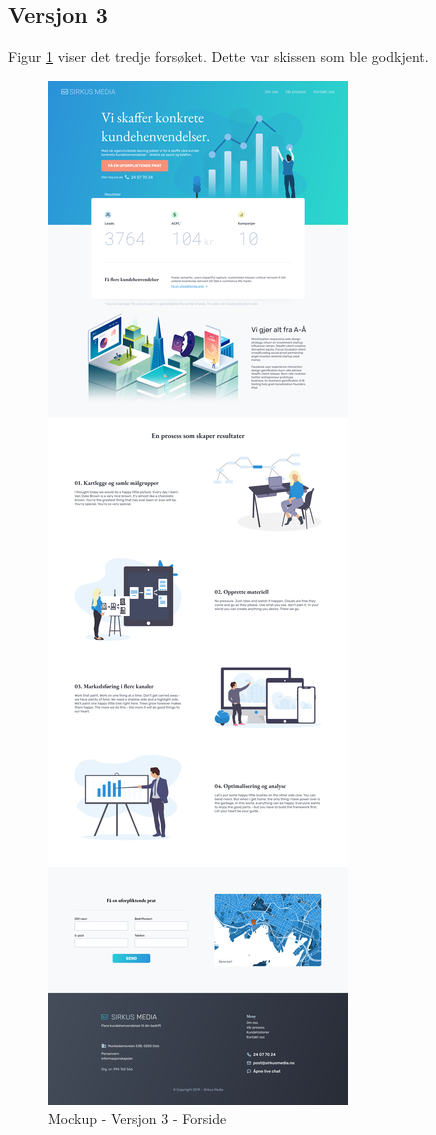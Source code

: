 \subsection{Versjon 3}
Figur \ref{fig:mockup-v3-index} viser det tredje forsøket. Dette var skissen som ble godkjent.
\begin{figure}[H]
    \centering
    \includegraphics[height=.82\textheight]{mockup3-index.png}
    \caption{Mockup - Versjon 3 - Forside}
    \label{fig:mockup-v3-index}
\end{figure}

